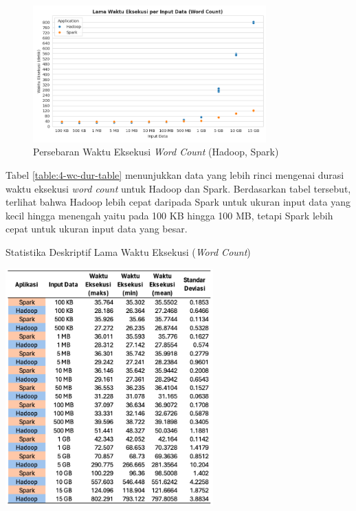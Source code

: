 \begin{figure}[h]
    \centering
    \includegraphics[width=0.8\textwidth]{figures/ch04/1-lama-waktu-eksekusi-wordcount.png}
    \caption{Persebaran Waktu Eksekusi \textit{Word Count} (Hadoop, Spark)}
    \label{fig:lama-waktu-eksekusi-wordcount}
\end{figure}

\newpage
Tabel \ref{table:4-wc-dur-table} menunjukkan data yang lebih rinci mengenai durasi waktu eksekusi \textit{word count} untuk Hadoop dan Spark. Berdasarkan tabel tersebut, terlihat bahwa Hadoop lebih cepat daripada Spark untuk ukuran input data yang kecil hingga menengah yaitu pada 100 KB hingga 100 MB, tetapi Spark lebih cepat untuk ukuran input data yang besar.

\begin{table}[ht]
  \centering
  \caption{Statistika Deskriptif Lama Waktu Eksekusi (\textit{Word Count})}
  \includegraphics[width=0.6\textwidth]{figures/ch04/4-wc-dur-table}
  \label{table:4-wc-dur-table}
\end{table}

